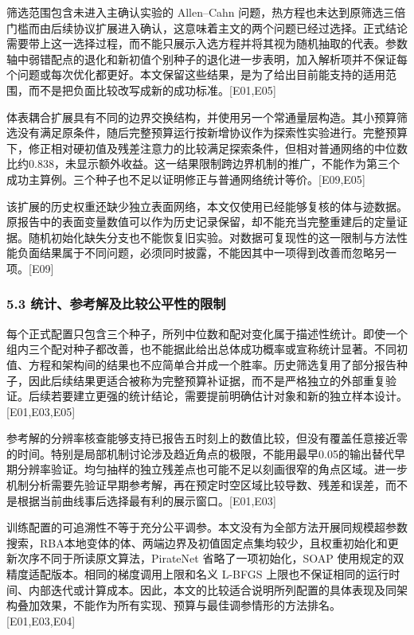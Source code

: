 \documentclass[11pt,a4paper]{article}
\begin{document}
筛选范围包含未进入主确认实验的 Allen--Cahn 问题，热方程也未达到原筛选三倍门槛而由后续协议扩展进入确认，这意味着主文的两个问题已经过选择。正式结论需要带上这一选择过程，而不能只展示入选方程并将其视为随机抽取的代表。参数轴中弱错配点的退化和新初值个别种子的退化进一步表明，加入解析项并不保证每个问题或每次优化都更好。本文保留这些结果，是为了给出目前能支持的适用范围，而不是把负面比较改写成新的成功标准。{[}E01,E05{]}

体表耦合扩展具有不同的边界交换结构，并使用另一个常通量层构造。其小预算筛选没有满足原条件，随后完整预算运行按新增协议作为探索性实验进行。完整预算下，修正相对硬初值及残差注意力的比较满足探索条件，但相对普通网络的中位数比约0.838，未显示额外收益。这一结果限制跨边界机制的推广，不能作为第三个成功主算例。三个种子也不足以证明修正与普通网络统计等价。{[}E09,E05{]}

该扩展的历史权重还缺少独立表面网络，本文仅使用已经能够复核的体与迹数据。原报告中的表面变量数值可以作为历史记录保留，却不能充当完整重建后的定量证据。随机初始化缺失分支也不能恢复旧实验。对数据可复现性的这一限制与方法性能负面结果属于不同问题，必须同时披露，不能因其中一项得到改善而忽略另一项。{[}E09{]}

\subsubsection{5.3 统计、参考解及比较公平性的限制}\label{ux7edfux8ba1ux53c2ux8003ux89e3ux53caux6bd4ux8f83ux516cux5e73ux6027ux7684ux9650ux5236}

每个正式配置只包含三个种子，所列中位数和配对变化属于描述性统计。即使一个组内三个配对种子都改善，也不能据此给出总体成功概率或宣称统计显著。不同初值、方程和架构间的结果也不应简单合并成一个胜率。历史筛选复用了部分报告种子，因此后续结果更适合被称为完整预算补证据，而不是严格独立的外部重复验证。后续若要建立更强的统计结论，需要提前明确估计对象和新的独立样本设计。{[}E01,E03,E05{]}

参考解的分辨率核查能够支持已报告五时刻上的数值比较，但没有覆盖任意接近零的时间。特别是局部机制讨论涉及趋近角点的极限，不能用最早0.05的输出替代早期分辨率验证。均匀抽样的独立残差点也可能不足以刻画很窄的角点区域。进一步机制分析需要先验证早期参考解，再在预定时空区域比较导数、残差和误差，而不是根据当前曲线事后选择最有利的展示窗口。{[}E01,E03{]}

训练配置的可追溯性不等于充分公平调参。本文没有为全部方法开展同规模超参数搜索，RBA本地变体的体、两端边界及初值固定点集均较少，且权重初始化和更新次序不同于所读原文算法，PirateNet 省略了一项初始化，SOAP 使用规定的双精度适配版本。相同的梯度调用上限和名义 L-BFGS 上限也不保证相同的运行时间、内部迭代或计算成本。因此，本文的比较适合说明所列配置的具体表现及同架构叠加效果，不能作为所有实现、预算与最佳调参情形的方法排名。{[}E01,E03,E04{]}
\end{document}
